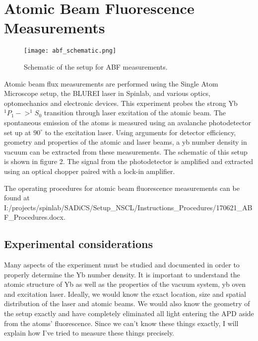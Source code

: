 \documentclass[12pt, a4paper]{article}
\begin{document}
\section{Atomic Beam Fluorescence Measurements}
\begin{wrapfigure}{r}{0.5\textwidth}
  \texttt{[image: abf\_schematic.png]}
  \vspace*{-3mm}
  \caption{Schematic of the setup for ABF measurements.}
\end{wrapfigure}
Atomic beam flux measurements are performed using the Single Atom Microscope setup, the BLUREI laser in Spinlab, and various optics, optomechanics and electronic devices. This experiment probes the strong Yb $^{1}P_{1} -> ^{1}S_{0}$ transition through laser excitation of the atomic beam. The spontaneous emission of the atoms is measured using an avalanche photodetector set up at $90^{\circ}$ to the excitation laser. Using arguments for detector efficiency, geometry and properties of the atomic and laser beams, a yb number density in vacuum can be extracted from these measurements. The schematic of this setup is shown in figure 2. The signal from the photodetector is amplified and extracted using an optical chopper paired with a lock-in amplifier.

The operating procedures for atomic beam fluorescence measurements can be found at I:/projects/spinlab/SADiCS/Setup\_NSCL/Instructions\_Procedures/170621\_ABF\_Procedures.docx.
 
\subsection{Experimental considerations}
Many aspects of the experiment must be studied and documented in order to properly determine the Yb number density. It is important to understand the atomic structure of Yb as well as the properties of the vacuum system, yb oven and excitation laser. Ideally, we would know the exact location, size and spatial distribution of the laser and atomic beams. We would also know the geometry of the setup exactly and have completely eliminated all light entering the APD aside from the atoms' fluorescence. Since we can't know these things exactly, I will explain how I've tried to measure these things precisely. 
\end{document}
